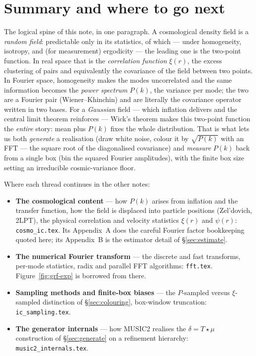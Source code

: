 \documentclass[12pt]{article}
\newcommand{\code}[1]{\texttt{#1}}
\begin{document}
\section{Summary and where to go next}
\label{sec:summary}

The logical spine of this note, in one paragraph.  A cosmological density
field is a \emph{random field}: predictable only in its statistics, of
which --- under homogeneity, isotropy, and (for measurement) ergodicity
--- the leading one is the two-point function.  In real space that is the
\emph{correlation function} $\xi(r)$, the excess clustering of pairs and
equivalently the covariance of the field between two points.  In Fourier
space, homogeneity makes the modes uncorrelated and the same information
becomes the \emph{power spectrum} $P(k)$, the variance per mode; the two
are a Fourier pair (Wiener--Khinchin) and are literally the covariance
operator written in two bases.  For a \emph{Gaussian} field --- which
inflation delivers and the central limit theorem reinforces --- Wick's
theorem makes this two-point function the \emph{entire} story: mean plus
$P(k)$ fixes the whole distribution.  That is what lets us both
\emph{generate} a realisation (draw white noise, colour it by
$\sqrt{P(k)}$ with an FFT --- the square root of the diagonalised
covariance) and \emph{measure} $P(k)$ back from a single box (bin the
squared Fourier amplitudes), with the finite box size setting an
irreducible cosmic-variance floor.

\medskip\noindent Where each thread continues in the other notes:
\begin{itemize}
  \item \textbf{The cosmological content} --- how $P(k)$ arises from
        inflation and the transfer function, how the field is displaced
        into particle positions (Zel'dovich, 2LPT), the physical
        correlation and velocity statistics $\xi(r)$ and $\psi(r)$:
        \code{cosmo\_ic.tex}.  Its Appendix~A does the careful Fourier
        factor bookkeeping quoted here; its Appendix~B is the estimator
        detail of \S\ref{sec:estimate}.
  \item \textbf{The numerical Fourier transform} --- the discrete and
        fast transforms, per-mode statistics, radix and parallel FFT
        algorithms: \code{fft.tex}.  Figure~\ref{fig:grf-exp} is borrowed
        from there.
  \item \textbf{Sampling methods and finite-box biases} --- the
        $P$-sampled versus $\xi$-sampled distinction of
        \S\ref{sec:colouring}, box-window truncation: \code{ic\_sampling.tex}.
  \item \textbf{The generator internals} --- how MUSIC2 realises the
        $\delta = T\star\mu$ construction of \S\ref{sec:generate} on a
        refinement hierarchy: \code{music2\_internals.tex}.
\end{itemize}
\end{document}
